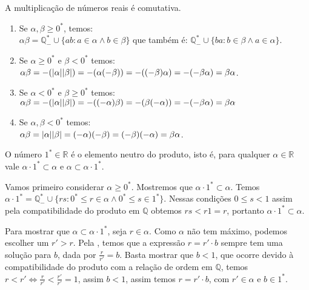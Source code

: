 \documentclass[../main.tex]{subfiles}
\begin{document}
\begin{prop}\label{reais-prop-produtoComutativo}
    A multiplicação de números reais é comutativa.
\end{prop}
\begin{dem}
    \begin{enumerate}
        \item Se $\alpha, \beta \geq 0^*$, temos: \\
            $\alpha \beta = \mathbb{Q}_{-}^* \cup \{ ab : a \in \alpha \land b \in \beta \}$ que também é:
            $\mathbb{Q}_{-}^* \cup \{ ba: b \in \beta \land a \in \alpha \}$.
        \item Se $\alpha \geq 0^*$ e $\beta < 0^*$ temos: \\
            $\alpha\beta = -(\abs{\alpha}\abs{\beta}) = -(\alpha(-\beta)) = -((-\beta)\alpha) = -(-\beta\alpha) = \beta\alpha$.
        \item Se $\alpha < 0^*$ e $\beta \geq 0^*$ temos: \\
            $\alpha\beta = -(\abs{\alpha}\abs{\beta}) = -((-\alpha)\beta) = -(\beta(-\alpha)) = -(-\beta\alpha) = \beta\alpha$
        \item Se $\alpha, \beta < 0^*$ temos: \\
            $\alpha \beta = \abs{\alpha}\abs{\beta} = (-\alpha)(-\beta) = (-\beta)(-\alpha) = \beta\alpha$.
    \end{enumerate}
\end{dem}

\begin{teo}\label{reais-teo-produtoNeutro}
    O número $1^* \in \mathbb{R}$ é o elemento neutro do produto, isto é, para qualquer $\alpha \in \mathbb{R}$ vale $\alpha \cdot 1^* \subset \alpha$ e $\alpha \subset \alpha \cdot 1^*$.
\end{teo}
\begin{dem}
    Vamos primeiro considerar $\alpha \geq 0^*$. Mostremos que $\alpha \cdot 1^* \subset \alpha$. Temos $\alpha \cdot 1^* = \mathbb{Q}_{-}^* \cup \{ rs : 0^* \leq r \in \alpha \land 0^* \leq s \in 1^*  \}$. Nessas condições $0 \leq s < 1$ assim pela compatibilidade do produto em $\mathbb{Q}$ obtemos $rs < r1 = r$, portanto $\alpha \cdot 1^* \subset \alpha$.

    Para mostrar que $\alpha \subset \alpha \cdot 1^*$, seja $r \in \alpha$. Como $\alpha$ não tem máximo, podemos escolher um $r' > r$. Pela , temos que a expressão $r = r' \cdot b$ sempre tem uma solução para $b$, dada por $\frac{r}{r'} = b$. Basta mostrar que $b < 1$, que ocorre devido à compatibilidade do produto com a relação de ordem em $\mathbb{Q}$, temos 
    $r < r' \iff \frac{r}{r'} < \frac{r'}{r'} = 1$, assim $b<1$, assim temos $r = r' \cdot b$, com $r' \in \alpha$ e $b \in 1^*$.
\end{dem}
\end{document}
